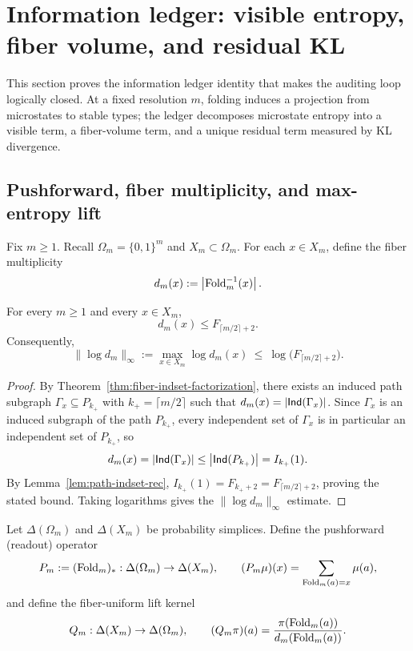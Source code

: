 \section{Information ledger: visible entropy, fiber volume, and residual KL}\label{sec:ledger}

This section proves the information ledger identity that makes the auditing loop logically closed.
At a fixed resolution $m$, folding induces a projection from microstates to stable types; the ledger decomposes microstate entropy into a visible term, a fiber-volume term, and a unique residual term measured by KL divergence.

\subsection{Pushforward, fiber multiplicity, and max-entropy lift}\label{subsec:ledger-setup}
Fix $m\ge 1$.
Recall $\Omega_m=\{0,1\}^m$ and $X_m\subset\Omega_m$.
For each $x\in X_m$, define the fiber multiplicity
\[
d_m(x):=\left\lvert \mathrm{Fold}_m^{-1}(x)\right\rvert.
\]

\begin{proposition}\label{prop:fiber-multiplicity-bound}
For every $m\ge 1$ and every $x\in X_m$,
\[
d_m(x)\le F_{\lceil m/2\rceil+2}.
\]
Consequently,
\[
\|\log d_m\|_{\infty}:=\max_{x\in X_m}\log d_m(x)\ \le\ \log\!\bigl(F_{\lceil m/2\rceil+2}\bigr).
\]
\end{proposition}
\begin{proof}
By Theorem~\ref{thm:fiber-indset-factorization}, there exists an induced path subgraph
\(
\Gamma_x\subseteq P_{k_+}
\)
with $k_+=\lceil m/2\rceil$ such that $d_m(x)=\left\lvert \mathsf{Ind}(\Gamma_x)\right\rvert$.
Since $\Gamma_x$ is an induced subgraph of the path $P_{k_+}$, every independent set of $\Gamma_x$ is in particular an independent set of $P_{k_+}$, so
\[
d_m(x)=\left\lvert \mathsf{Ind}(\Gamma_x)\right\rvert\le \left\lvert \mathsf{Ind}(P_{k_+})\right\rvert=I_{k_+}(1).
\]
By Lemma~\ref{lem:path-indset-rec}, $I_{k_+}(1)=F_{k_+ +2}=F_{\lceil m/2\rceil+2}$, proving the stated bound.
Taking logarithms gives the $\|\log d_m\|_\infty$ estimate.
\end{proof}

\begin{definition}\label{def:pushforward-lift}
Let $\Delta(\Omega_m)$ and $\Delta(X_m)$ be probability simplices.
Define the pushforward (readout) operator
\[
P_m:=(\mathrm{Fold}_m)_*:\Delta(\Omega_m)\to\Delta(X_m),
\qquad
(P_m\mu)(x)=\sum_{\mathrm{Fold}_m(a)=x}\mu(a),
\]
and define the fiber-uniform lift kernel
\[
Q_m:\Delta(X_m)\to\Delta(\Omega_m),
\qquad
(Q_m\pi)(a)=\frac{\pi(\mathrm{Fold}_m(a))}{d_m(\mathrm{Fold}_m(a))}.
\]
\end{definition}

